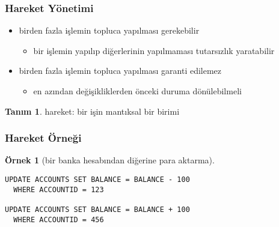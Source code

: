 \documentclass[dvipsnames]{beamer}
\theoremstyle{definition}
\newtheorem{tanim}[theorem]{Tanım}
\theoremstyle{example}
\newtheorem{ornek}[theorem]{Örnek}
\theoremstyle{plain}
\begin{document}
\begin{frame}
  \frametitle{Hareket Yönetimi}

  \begin{itemize}
    \item birden fazla işlemin topluca yapılması gerekebilir
    \begin{itemize}
      \item bir işlemin yapılıp diğerlerinin yapılmaması tutarsızlık yaratabilir
    \end{itemize}

    \pause
    \item birden fazla işlemin topluca yapılması garanti edilemez
    \begin{itemize}
      \item en azından değişikliklerden önceki duruma dönülebilmeli
    \end{itemize}
  \end{itemize}

  \pause
  \begin{tanim}
    \alert{hareket}: bir işin mantıksal bir birimi
  \end{tanim}
\end{frame}

\begin{frame}[fragile]
  \frametitle{Hareket Örneği}

  \begin{ornek}[bir banka hesabından diğerine para aktarma]
    \begin{lstlisting}
UPDATE ACCOUNTS SET BALANCE = BALANCE - 100
  WHERE ACCOUNTID = 123

UPDATE ACCOUNTS SET BALANCE = BALANCE + 100
  WHERE ACCOUNTID = 456
    \end{lstlisting}
  \end{ornek}
\end{frame}
\end{document}
